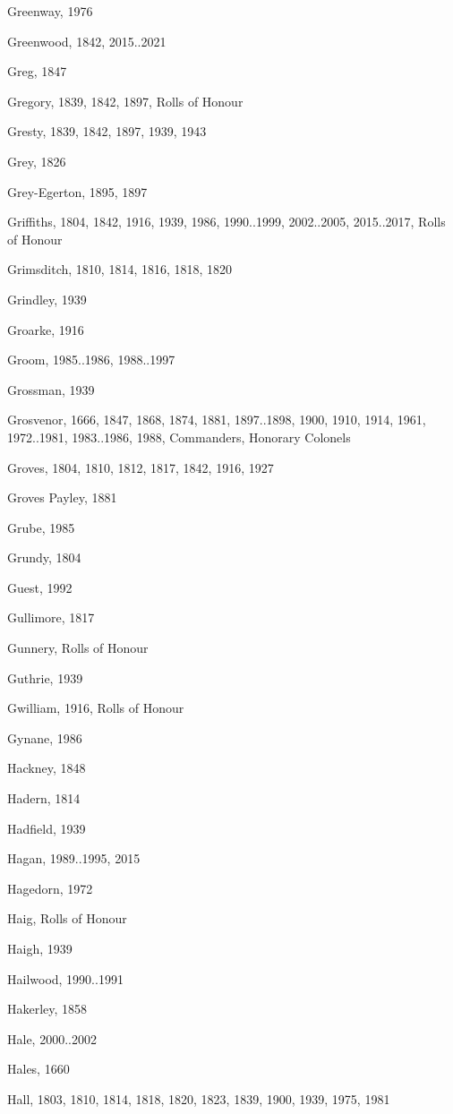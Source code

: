 \begin{theindex}
\item Greenway, 1976
\item Greenwood, 1842, 2015..2021
\item Greg, 1847
\item Gregory, 1839, 1842, 1897, Rolls of Honour
\item Gresty, 1839, 1842, 1897, 1939, 1943
\item Grey, 1826
\item Grey-Egerton, 1895, 1897
\item Griffiths, 1804, 1842, 1916, 1939, 1986, 1990..1999, 2002..2005, 2015..2017, Rolls of Honour
\item Grimsditch, 1810, 1814, 1816, 1818, 1820
\item Grindley, 1939
\item Groarke, 1916
\item Groom, 1985..1986, 1988..1997
\item Grossman, 1939
\item Grosvenor, 1666, 1847, 1868, 1874, 1881, 1897..1898, 1900, 1910, 1914, 1961, 1972..1981, 1983..1986, 1988, Commanders, Honorary Colonels
\item Groves, 1804, 1810, 1812, 1817, 1842, 1916, 1927
\item Groves Payley, 1881
\item Grube, 1985
\item Grundy, 1804
\item Guest, 1992
\item Gullimore, 1817
\item Gunnery, Rolls of Honour
\item Guthrie, 1939
\item Gwilliam, 1916, Rolls of Honour
\item Gynane, 1986
\item Hackney, 1848
\item Hadern, 1814
\item Hadfield, 1939
\item Hagan, 1989..1995, 2015
\item Hagedorn, 1972
\item Haig, Rolls of Honour
\item Haigh, 1939
\item Hailwood, 1990..1991
\item Hakerley, 1858
\item Hale, 2000..2002
\item Hales, 1660
\item Hall, 1803, 1810, 1814, 1818, 1820, 1823, 1839, 1900, 1939, 1975, 1981

\end{theindex}
